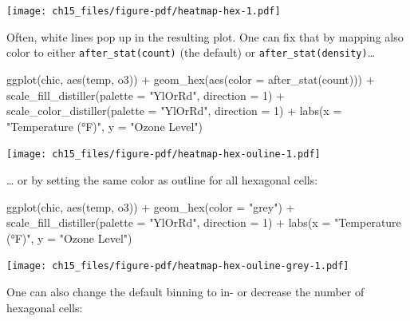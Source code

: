 \documentclass[
  letterpaper,
  DIV=11,
  numbers=noendperiod]{scrreprt}
\newenvironment{Shaded}{\begin{snugshade}}{\end{snugshade}}
\newcommand{\AttributeTok}[1]{\textcolor[rgb]{0.40,0.45,0.13}{#1}}
\newcommand{\DecValTok}[1]{\textcolor[rgb]{0.68,0.00,0.00}{#1}}
\newcommand{\FunctionTok}[1]{\textcolor[rgb]{0.28,0.35,0.67}{#1}}
\newcommand{\NormalTok}[1]{\textcolor[rgb]{0.00,0.23,0.31}{#1}}
\newcommand{\SpecialCharTok}[1]{\textcolor[rgb]{0.37,0.37,0.37}{#1}}
\newcommand{\StringTok}[1]{\textcolor[rgb]{0.13,0.47,0.30}{#1}}
\begin{document}
\texttt{[image: ch15\_files/figure-pdf/heatmap-hex-1.pdf]}

Often, white lines pop up in the resulting plot. One can fix that by
mapping also color to either \texttt{after\_stat(count)} (the default)
or \texttt{after\_stat(density)}\ldots{}

\begin{Shaded}
\begin{Highlighting}[]
\FunctionTok{ggplot}\NormalTok{(chic, }\FunctionTok{aes}\NormalTok{(temp, o3)) }\SpecialCharTok{+}
  \FunctionTok{geom\_hex}\NormalTok{(}\FunctionTok{aes}\NormalTok{(}\AttributeTok{color =} \FunctionTok{after\_stat}\NormalTok{(count))) }\SpecialCharTok{+}
  \FunctionTok{scale\_fill\_distiller}\NormalTok{(}\AttributeTok{palette =} \StringTok{"YlOrRd"}\NormalTok{, }\AttributeTok{direction =} \DecValTok{1}\NormalTok{) }\SpecialCharTok{+}
  \FunctionTok{scale\_color\_distiller}\NormalTok{(}\AttributeTok{palette =} \StringTok{"YlOrRd"}\NormalTok{, }\AttributeTok{direction =} \DecValTok{1}\NormalTok{) }\SpecialCharTok{+}
  \FunctionTok{labs}\NormalTok{(}\AttributeTok{x =} \StringTok{"Temperature (°F)"}\NormalTok{, }\AttributeTok{y =} \StringTok{"Ozone Level"}\NormalTok{)}
\end{Highlighting}
\end{Shaded}

\texttt{[image: ch15\_files/figure-pdf/heatmap-hex-ouline-1.pdf]}

\ldots{} or by setting the same color as outline for all hexagonal
cells:

\begin{Shaded}
\begin{Highlighting}[]
\FunctionTok{ggplot}\NormalTok{(chic, }\FunctionTok{aes}\NormalTok{(temp, o3)) }\SpecialCharTok{+}
  \FunctionTok{geom\_hex}\NormalTok{(}\AttributeTok{color =} \StringTok{"grey"}\NormalTok{) }\SpecialCharTok{+}
  \FunctionTok{scale\_fill\_distiller}\NormalTok{(}\AttributeTok{palette =} \StringTok{"YlOrRd"}\NormalTok{, }\AttributeTok{direction =} \DecValTok{1}\NormalTok{) }\SpecialCharTok{+}
  \FunctionTok{labs}\NormalTok{(}\AttributeTok{x =} \StringTok{"Temperature (°F)"}\NormalTok{, }\AttributeTok{y =} \StringTok{"Ozone Level"}\NormalTok{)}
\end{Highlighting}
\end{Shaded}

\texttt{[image: ch15\_files/figure-pdf/heatmap-hex-ouline-grey-1.pdf]}

One can also change the default binning to in- or decrease the number of
hexagonal cells:
\end{document}
